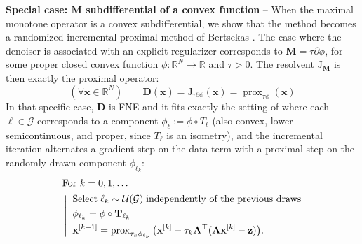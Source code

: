 \documentclass{article}
\newcommand{\R}{\mathbb{R}}
\newcommand{\prox}{\operatorname{prox}}
\newcommand{\argmin}{\operatorname*{arg\,min}}
\newcommand{\xb}{\mathbf{x}}
\newcommand{\Ab}{\mathbf{A}}
\newcommand{\zb}{\mathbf{z}}
\begin{document}
%
\noindent \textbf{Special case: $\mathbf{M}$ subdifferential of a convex function} -- When the maximal monotone operator is a convex subdifferential, we show that the method becomes a
randomized incremental proximal method of Bertsekas \cite{Bertsekas2011}. The case where the denoiser is associated with an explicit regularizer corresponds
to $\mathbf{M} = \tau \partial \phi$, for some proper closed convex function $\phi :
\R^N \to \mathbb{R}$ and $\tau>0$. The resolvent $\mathrm{J}_{\mathbf{M}}$ is then exactly the
proximal operator:
\begin{equation*}
(\forall \xb\in \mathbb{R}^N) \qquad   \mathbf{D}(\xb) = \mathrm{J}_{\tau \partial \phi}(\xb) = \prox_{\tau\phi}(\xb)
\end{equation*}
In that specific case, $\mathbf{D}$ is FNE and it fits exactly the setting of \cite{Bertsekas2011} where
each $\ell \in \mathcal{G}$ corresponds to a component $\phi_\ell := \phi
\circ T_\ell$ (also convex, lower semicontinuous, and proper, since $T_\ell$ is an
isometry), and the incremental iteration alternates a gradient step
on the data-term with a proximal step on the randomly drawn component
$\phi_{\ell_k}$:%
%
\begin{align}
\label{alg:pnp-mc-proximal}
    &\text{For } k=0,1,\dots \nonumber\\
    &\left|
    \begin{aligned}
        &\;\;\text{Select} \;\ell_k \sim \mathcal{U}(\mathcal{G}) \;\text{independently of the previous draws}\\
        &\;\; \phi_{\ell_k} = \phi \circ \mathbf{T}_{\ell_k}\\
        &\;\;\xb^{[k+1]} = \prox_{\tau_k\phi_{\ell_k}} \big(\xb^{[k]} - \tau_k \Ab^\top (\Ab\xb^{[k]} - \zb)\big).
    \end{aligned}
    \right.\raisetag{17pt}
\end{align}

\end{document}

